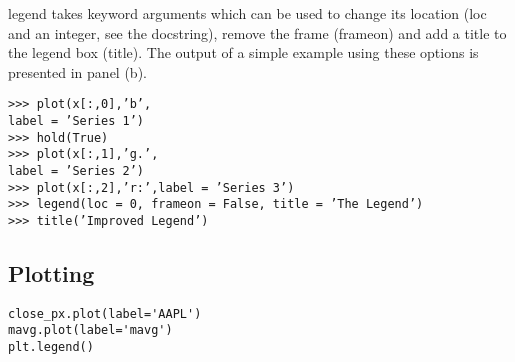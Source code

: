 \documentclass[KSmain.tex]{subfiles}
\begin{document}
legend takes keyword arguments which can be used to change its location (loc and an integer, see the
docstring), remove the frame (frameon) and add a title to the legend box (title). The output of a simple
example using these options is presented in panel (b).



\begin{framed}
\begin{verbatim}
>>> plot(x[:,0],’b’,
label = ’Series 1’)
>>> hold(True)
>>> plot(x[:,1],’g.’,
label = ’Series 2’)
>>> plot(x[:,2],’r:’,label = ’Series 3’)
>>> legend(loc = 0, frameon = False, title = ’The Legend’)
>>> title(’Improved Legend’)
\end{verbatim}
\end{framed}

\newpage
\subsection{Plotting}

\begin{framed}
\begin{verbatim}
close_px.plot(label='AAPL')
mavg.plot(label='mavg')
plt.legend()

\end{verbatim}
\end{framed}
\end{document}
